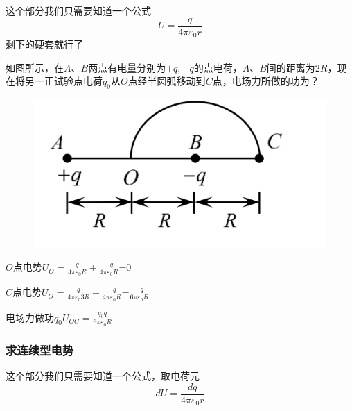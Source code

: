\documentclass[lang=cn,10pt]{elegantbook}
\begin{document}
		这个部分我们只需要知道一个公式
		\begin{equation*}
			U=\frac{q}{4\pi\varepsilon_{0}r}
		\end{equation*}
		剩下的硬套就行了
			\begin{example}
			如图所示，在$A$、$B$两点有电量分别为$+q,-q$的点电荷，$A$、$B$间的距离为$2R$，现在将另一正试验点电荷$q_{0}$从$O$点经半圆弧移动到$C$点，电场力所做的功为？
			\begin{figure}[H]
				\centering
				\includegraphics[width=0.18\linewidth]{image/IMG_0415(20231116-231400)}
				\caption{}
				\label{fig:img041520231116-231400}
			\end{figure}
		\end{example}
		\begin{solution}
			
			$O$点电势$U_{O}=\frac{q}{4\pi\varepsilon_{0}R}+\frac{-q}{4\pi\varepsilon_{0}R}$=0
			
			$C$点电势$U_{O}=\frac{q}{4\pi\varepsilon_{0}3R}+\frac{-q}{4\pi\varepsilon_{0}R}$=$\frac{-q}{6\pi\varepsilon_{0}R}$
			
			电场力做功$q_{0}U_{OC}=\frac{q_{0}q}{6\pi\varepsilon_{0}R}$
		\end{solution}
		\subsubsection{求连续型电势}
		这个部分我们只需要知道一个公式，取电荷元
		\begin{equation*}
			dU=\frac{dq}{4\pi\varepsilon_{0}r}
		\end{equation*}
		
\end{document}
